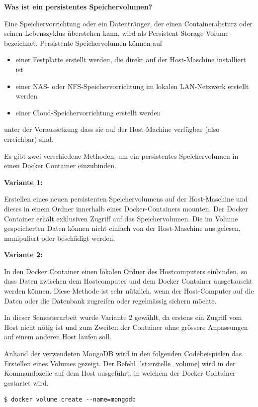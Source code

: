 \textbf{Was ist ein persistentes Speichervolumen?}

Eine Speichervorrichtung oder ein Datentr{\"a}nger, der einen Containerabsturz oder seinen Lebenszyklus {\"u}berstehen kann, wird als Persistent Storage Volume bezeichnet. Persistente Speichervolumen k{\"o}nnen auf
\begin{itemize}
  \item einer Festplatte erstellt werden, die direkt auf der Host-Maschine installiert ist 
  \item einer NAS- oder NFS-Speichervorrichtung im lokalen LAN-Netzwerk erstellt werden
  \item einer Cloud-Speichervorrichtung erstellt werden
\end{itemize}
unter der Voraussetzung dass sie auf der Host-Machine verf{\"u}gbar (also erreichbar) sind.

Es gibt zwei verschiedene Methoden, um ein persistentes Speichervolumen in einen Docker Container einzubinden.

\textbf{Variante 1:}

Erstellen eines neuen persistenten Speichervolumens auf der Host-Maschine und dieses in einem Ordner innerhalb eines Docker-Containers mounten. Der Docker Container erh{\"a}lt exklusiven Zugriff auf das Speichervolumen. Die im Volume gespeicherten Daten k{\"o}nnen nicht einfach von der Host-Maschine aus gelesen, manipuliert oder besch{\"a}digt werden.
  
\textbf{Variante 2:}

In den Docker Container einen lokalen Ordner des Hostcomputers einbinden, so dass Daten zwischen dem Hostcomputer und dem Docker Container ausgetauscht werden k{\"o}nnen. Diese Methode ist sehr n{\"u}tzlich, wenn der Host-Computer auf die Daten oder die Datenbank zugreifen oder regelm{\"a}ssig sichern m{\"o}chte.

In dieser Semesterarbeit wurde Variante 2 gew{\"a}hlt, da erstens ein Zugriff vom Host nicht n{\"o}tig ist und zum Zweiten der Container ohne gr{\"o}ssere Anpassungen auf einem anderen Host laufen soll. 

Anhand der verwendeten MongoDB wird in den folgenden Codebeispielen das Erstellen eines Volumes gezeigt. Der Befehl \ref{lst:erstelle_volume} wird in der Kommandozeile auf dem Host ausgef{\"u}hrt, in welchem der Docker Container gestartet wird.

\begin{lstlisting}[float=h,frame=tb,caption={Befehl zum Volume erstellen},label=lst:erstelle_volume]
  $ docker volume create --name=mongodb
\end{lstlisting}  

